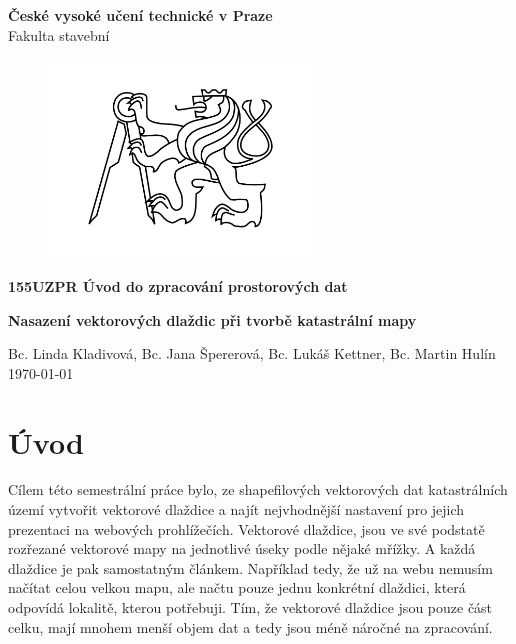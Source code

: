 \documentclass[12pt]{article}
\begin{document}
\begin{titlepage}
\centering
\Large \textbf{České vysoké učení technické v Praze }\\ Fakulta stavební
\vspace{2cm}

\begin{figure}[h!] %
\centering
\includegraphics[width=7cm]{./img/cvut.png}
\end{figure}
 
\Large \textbf{155UZPR Úvod do zpracování prostorových dat}
\vspace{1cm}

\LARGE  \textbf{ Nasazení vektorových dlaždic při tvorbě katastrální mapy}
\vspace{3cm}

\Large Bc. Linda Kladivová, Bc. Jana Špererová, Bc. Lukáš Kettner, Bc. Martin Hulín \\ \today

 \thispagestyle{empty} %
\end{titlepage}

\tableofcontents    %
\newpage %
\section{Úvod}
Cílem této semestrální práce bylo, ze shapefilových vektorových dat katastrálních území vytvořit vektorové dlaždice a najít nejvhodnější nastavení pro jejich prezentaci na webových prohlížečích.
Vektorové dlaždice, jsou ve své podstatě rozřezané vektorové mapy na jednotlivé úseky podle nějaké mřížky. A každá dlaždice je pak samostatným článkem. Například tedy, že už na webu nemusím načítat celou velkou mapu, ale načtu pouze jednu konkrétní dlaždici, která odpovídá lokalitě, kterou potřebuji. Tím, že vektorové dlaždice jsou pouze část celku, mají mnohem menší objem dat a tedy jsou méně náročné na zpracování.
\end{document}

